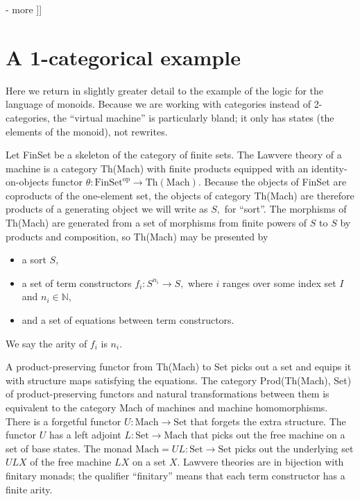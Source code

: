 \documentclass{article}
\newcommand{\maps}{\colon}
\newcommand{\FinSet}{\mathrm{FinSet}}
\newcommand{\Set}{\mathrm{Set}}
\newcommand{\Mach}{\mathrm{Mach}}
\newcommand{\op}{\mathrm{op}}
\newcommand{\NN}{\mathbb{N}}
\begin{document}
- more
]]

\section{A 1-categorical example}

Here we return in slightly greater detail to the example of the logic for the language of monoids.  Because we are working with categories instead of 2-categories, the ``virtual machine'' is particularly bland; it only has states (the elements of the monoid), not rewrites.

Let FinSet be a skeleton of the category of finite sets.  The Lawvere theory of a machine is a category Th(Mach) with finite products equipped with an identity-on-objects functor $\theta\maps \FinSet^\op \to \mathrm{Th(Mach)}.$  Because the objects of FinSet are coproducts of the one-element set, the objects of category Th(Mach) are therefore products of a generating object we will write as $S,$ for ``sort''.  The morphisms of Th(Mach) are generated from a set of morphisms from finite powers of $S$ to $S$ by products and composition, so Th(Mach) may be presented by 
\begin{itemize}
  \item a sort $S$,
  \item a set of term constructors $f_i\maps S^{n_i} \to S,$ where $i$ ranges over some index set $I$ and $n_i \in \NN,$
  \item and a set of equations between term constructors.
\end{itemize}
We say the arity of $f_i$ is $n_i.$

A product-preserving functor from Th(Mach) to Set picks out a set and equips it with structure maps satisfying the equations.  The category Prod(Th(Mach), Set) of product-preserving functors and natural transformations between them is equivalent to the category Mach of machines and machine homomorphisms.  There is a forgetful functor ${U\maps \Mach \to \Set}$ that forgets the extra structure.  The functor $U$ has a left adjoint ${L\maps \Set \to \Mach}$ that picks out the free machine on a set of base states.  The monad $\Mach = UL\maps \Set \to \Set$ picks out the underlying set $ULX$ of the free machine $LX$ on a set $X$.  Lawvere theories are in bijection with finitary monads; the qualifier ``finitary'' means that each term constructor has a finite arity.
\end{document}
